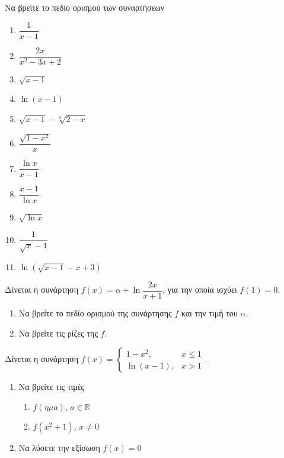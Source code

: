\documentclass{presentation}
\begin{document}
\begin{askisi}
  Να βρείτε το πεδίο ορισμού των συναρτήσεων

  \begin{multicols}{2}
    \begin{enumerate}
      \item<1-> $\dfrac{1}{x-1}$
      \item<2-> $\dfrac{2x}{x^2-3x+2}$
      \item<3-> $\sqrt{x-1}$
      \item<4-> $\ln (x-1)$
      \item<5-> $\sqrt{x-1}-\sqrt[3]{2-x}$
      \item<6-> $\dfrac{\sqrt{1-x^2}}{x}$
      \item<7-> $\dfrac{\ln x}{x-1}$
      \item<8-> $\dfrac{x-1}{\ln x}$
      \item<9-> $\sqrt{\ln x}$
      \item<10-> $\dfrac{1}{\sqrt{x}-1}$
      \item<11-> $\ln \left(\sqrt{x-1}-x+3\right)$
    \end{enumerate}
  \end{multicols}
\end{askisi}

\begin{askisi}
  Δίνεται η συνάρτηση $f(x)=α+\ln \dfrac{2x}{x+1}$, για την οποία ισχύει $f(1)=0$.
  \begin{enumerate}
    \item<1-> Να βρείτε το πεδίο ορισμού της συνάρτησης $f$ και την τιμή του $α$.
    \item<2-> Να βρείτε τις ρίζες της $f$.
  \end{enumerate}
\end{askisi}

\begin{askisi}
  Δίνεται η συνάρτηση $f(x)=\begin{cases}
      1-x^2,     & x\le 1 \\
      \ln (x-1), & x>1
    \end{cases}$.
  \begin{enumerate}
    \item<1-> Να βρείτε τις τιμές
          \begin{enumerate}
            \item<1-> $f(ημ a)$, $a\in\mathbb{R}$
            \item<2-> $f(x^2+1)$, $x\ne 0$
          \end{enumerate}
    \item<3-> Να λύσετε την εξίσωση $f(x)=0$
  \end{enumerate}
\end{askisi}

\moodle
\end{document}
